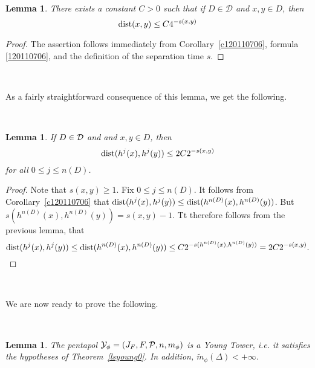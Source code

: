 \documentclass[12pt]{amsart}
\numberwithin{equation}{section}
\newcommand{\blem}{\begin{lem}}
\newcommand{\elem}{\end{lem}}
\newtheorem{lem}[thm]{Lemma}
\def\dist{\text{{\rm dist}}}  \def\Dist{\text{{\rm Dist}}}
\def\De{\Delta}               \def\e{\varepsilon}          \def\f{\phi}
\begin{document}
\

\blem\label{l220110705}
There exists a constant $C>0$ such that if $D\in\mathcal D$ and $x,y\in D$, then
$$
\dist(x,y)\le C4^{-s(x,y)}
$$
\elem

\begin{proof}
The assertion follows immediately from Corollary~\ref{c120110706},
formula \eqref{120110706}, and the definition of the separation time $s$. 
\end{proof}

\

\fr As a fairly straightforward consequence of this lemma, we get the
following.

\

\blem\label{l320110705}
If $D\in\mathcal D$ and  and $x,y\in D$, then
$$
\dist(h^j(x),h^j(y))\le 2C2^{-s(x,y)}
$$
for all $0\le j\le n(D)$.
\elem

\begin{proof}
Note that $s(x,y)\ge 1$. Fix $0\le j\le n(D)$. It follows from
Corollary~\ref{c120110706} that
$\dist(h^j(x),h^j(y))\le\dist(h^{n(D)}(x),h^{n(D)}(y))$. But
$s(h^{n(D)}(x),h^{n(D)}(y))=s(x,y)-1$. Tt therefore follows from the 
previous lemma, that
$$
\dist(h^j(x),h^j(y))
\le\dist(h^{n(D)}(x),h^{n(D)}(y))
\le C2^{-s(h^{n(D)}(x),h^{n(D)}(y))}
=   2C2^{-s(x,y)}.
$$
 
\end{proof}

\

\fr We are now ready to prove the following.

\

\blem\label{l120110707}
The pentapol $\mathcal Y_\phi=(J_F,F,{\mathcal P},n,m_\phi)$ is a Young
Tower, i.e. it satisfies the hypotheses of Theorem~\ref{lsyoung0}. In
addition, $\tilde m_\phi(\De)<+\infty$.
\elem
\end{document}
